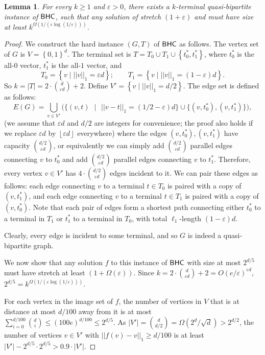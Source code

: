 \documentclass[11pt]{article}
\newtheorem{lemma}[theorem]{Lemma}
\theoremstyle{definition}
\newcommand{\set}[1]{\left\{ #1 \right\}}
\newcommand{\eps}{{\varepsilon}}
\def\floor#1{\left\lfloor #1 \right\rfloor}
\begin{document}
\begin{lemma}
For every $k\ge 1$ and $\eps>0$, there exists a $k$-terminal quasi-bipartite instance of $\textnormal{\textsf{BHC}}$, such that any solution of stretch $(1+\eps)$ and must have size at least $k^{\Omega(1/(\eps\log (1/\eps)))}$.
\end{lemma}

\begin{proof}
We construct the hard instance $(G,T)$ of $\textnormal{\textsf{BHC}}$  as follows. The vertex set of $G$ is $V=\set{0,1}^d$. The terminal set is $T=T_0\cup T_1\cup \set{t^*_0,t^*_1}$, where $t^*_0$ is the all-$0$ vector, $t^*_1$ is the all-$1$ vector, and
\[
T_0=\set{v\mid ||v||_1=\eps d}; \quad\quad T_1=\set{v\mid ||v||_1=(1-\eps) d}.
\]
So $k=|T|=2\cdot\binom{d}{\eps d}+2$. Define $V'=\set{v\mid ||v||_1= d/2}$. The edge set is defined as follows:
\[
E(G)=\bigcup_{v\in V'}\bigg(\bigg\{(v,t)\text{ }\bigg|\text{ } ||v-t||_1=(1/2-\eps)d\bigg\}\cup \bigg\{(v,t^*_0),(v,t^*_1)\bigg\}\bigg),
\]
(we assume that $\eps d$ and $d/2$ are integers for convenience; the proof also holds if we replace $\eps d$ by $\floor{\eps d}$ everywhere)
where the edges $(v,t^*_0),(v,t^*_1)$ have capacity $\binom{d/2}{\eps d}$, or equivalently we can simply add $\binom{d/2}{\eps d}$ parallel edges connecting $v$ to $t^*_0$ and add $\binom{d/2}{\eps d}$ parallel edges connecting $v$ to $t^*_1$. Therefore, every vertex $v\in V'$ has $4\cdot \binom{d/2}{\eps d}$ edges incident to it. We can pair these edges as follows: each edge connecting $v$ to a terminal $t\in T_0$ is paired with a copy of $(v,t^*_1)$, and each edge connecting $v$ to a terminal $t\in T_1$ is paired with a copy of $(v,t^*_0)$. Note that each pair of edges form a shortest path connecting either $t^*_0$ to a terminal in $T_1$ or $t^*_1$ to a terminal in $T_0$, with total $\ell_1$-length $(1-\eps)d$.

Clearly, every edge is incident to some terminal, and so $G$ is indeed a quasi-bipartite graph.


We now show that any solution $f$ to this instance of $\textnormal{\textsf{BHC}}$ with size at most $2^{d/5}$ must have stretch at least $(1+\Omega(\eps))$. Since
$k=2\cdot\binom{d}{\eps d}+2=O(e/\eps)^{\eps d}$, $2^{d/5}=k^{\Omega(1/(\eps\log (1/\eps)))}$.

For each vertex in the image set of $f$, the number of vertices in $V$ that is at distance at most $d/100$ away from it is at most $\sum_{i=0}^{d/100} \binom{d}{i}\le (100e)^{d/100}\le 2^{d/5}$.
As $|V'|=\binom{d}{d/2}=\Omega(2^d/\sqrt{d})>2^{d/2}$, the number of vertices $v\in V'$ with $||f(v)-v||_1\ge d/100$ is at least
$|V'|-2^{d/5}\cdot 2^{d/5}>0.9\cdot |V'|$.


\end{proof}
\end{document}
